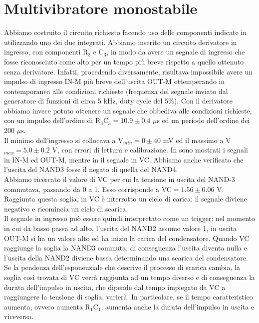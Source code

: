 \section{Multivibratore monostabile}
Abbiamo costruito il circuito richiesto facendo uso delle componenti indicate in  utilizzando uno dei due integrati. Abbiamo inserito un circuito derivatore in ingresso, con componenti R$_3$ e C$_3$, in modo da avere un segnale di ingresso che fosse riconosciuto come alto per un tempo più breve rispetto a quello ottenuto senza derivatore. Infatti, procedendo diversamente, risultava impossibile avere un impulso di ingresso IN-M più breve dell'uscita OUT-M ottemperando in contemporanea alle condizioni richieste (frequenza del segnale inviato dal generatore di funzioni di circa 5 kHz, duty cycle del 5\%). Con il derivatore abbiamo invece potuto ottenere un segnale che obbediva alle condizioni richieste, con un impulso dell'ordine di R$_3 $C$_3 = 10.9 \pm 0.4$ $\mu$s ed un periodo dell'ordine dei 200 $\mu$s.\\
Il minimo dell'ingresso si collocava a V$_{min} = 0 \pm 40$ mV ed il massimo a V$_{max} = 5.0 \pm 0.2$ V, con errori di lettura e calibrazione. In  sono mostrati i segnali in IN-M ed OUT-M, mentre in  il segnale in VC. Abbiamo anche verificato che l'uscita del NAND3 fosse il negato di quella del NAND4.\\ 
Abbiamo ricercato il valore di VC per cui la tensione in uscita del NAND-3 commutava, passando da 0 a 1. Esso corrisponde a VC$ = 1.56 \pm 0.06$ V. Raggiunta questa soglia, in VC è interrotto un ciclo di carica; il segnale diviene negativo e ricomincia un ciclo di scarica.\\
Il segnale in ingresso può essere quindi interpretato come un trigger: nel momento in cui da basso passa ad alto, l'uscita del NAND2 assume valore 1, in uscita OUT-M si ha un valore alto ed ha inizio la carica del condensatore. Quando VC raggiunge la soglia la NAND3 commuta, di conseguenza l'uscita diventa nulla e l'uscita della NAND2 diviene bassa determinando una scarica del condensatore.\\
Se la pendenza dell'esponenziale che descrive il processo di scarica cambia, la soglia così trovata di VC verrà raggiunta ad un tempo diverso e di conseguenza la durata dell'impulso in uscita, che dipende dal tempo impiegato da VC a raggiungere la tensione di soglia, varierà. In particolare, se il tempo caratteristico aumenta, ovvero aumenta R$_1$C$_1$, aumenta anche la durata dell'impulso in uscita e viceversa.\\
